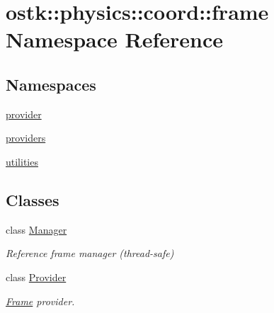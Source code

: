 \hypertarget{namespaceostk_1_1physics_1_1coord_1_1frame}{}\section{ostk\+:\+:physics\+:\+:coord\+:\+:frame Namespace Reference}
\label{namespaceostk_1_1physics_1_1coord_1_1frame}
\subsection*{Namespaces}
\begin{DoxyCompactItemize}
\item 
 \hyperlink{namespaceostk_1_1physics_1_1coord_1_1frame_1_1provider}{provider}
\item 
 \hyperlink{namespaceostk_1_1physics_1_1coord_1_1frame_1_1providers}{providers}
\item 
 \hyperlink{namespaceostk_1_1physics_1_1coord_1_1frame_1_1utilities}{utilities}
\end{DoxyCompactItemize}
\subsection*{Classes}
\begin{DoxyCompactItemize}
\item 
class \hyperlink{classostk_1_1physics_1_1coord_1_1frame_1_1_manager}{Manager}
\begin{DoxyCompactList}\small\item\em Reference frame manager (thread-\/safe) \end{DoxyCompactList}\item 
class \hyperlink{classostk_1_1physics_1_1coord_1_1frame_1_1_provider}{Provider}
\begin{DoxyCompactList}\small\item\em \hyperlink{classostk_1_1physics_1_1coord_1_1_frame}{Frame} provider. \end{DoxyCompactList}\end{DoxyCompactItemize}
